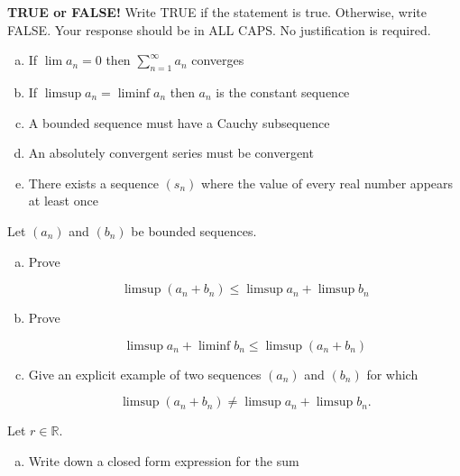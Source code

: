 \documentclass[11pt]{exam}
\theoremstyle{definition}
\begin{document}
\begin{questions}

\addpoints

\question[10]\mbox{}
\textbf{TRUE or FALSE!}  Write  TRUE if the statement is true.  Otherwise, write FALSE.  Your response should be in ALL CAPS.  No justification is required.
\begin{enumerate}[(a)]
\item  
If $\lim a_n = 0$ then $\sum_{n=1}^\infty a_n$ converges
\vspace{1.3in}
\item
If $\limsup a_n=\liminf a_n$ then $a_n$ is the constant sequence
\vspace{1.3in}
\item
A bounded sequence must have a Cauchy subsequence
\vspace{1.3in}
\item
An absolutely convergent series must be convergent
\vspace{1.3in}
\item  
There exists a sequence $(s_n)$ where the value of every real number appears at least once
\vspace{1.3in}
\end{enumerate}

\newpage
\question[10]\mbox{}

Let $(a_n)$ and $(b_n)$ be bounded sequences.
\begin{enumerate}[(a)]
\item Prove

$$\limsup (a_n+b_n)\leq \limsup a_n + \limsup b_n$$
\vspace{2.5in}
\item Prove

$$\limsup a_n + \liminf b_n \leq\limsup (a_n+b_n)$$
\vspace{2.5in}

\item

Give an explicit example of two sequences $(a_n)$ and $(b_n)$ for which 

$$\limsup (a_n+b_n)\neq \limsup a_n + \limsup b_n.$$

\end{enumerate}


\newpage
\question[10]\mbox{}

Let $r\in\mathbb{R}$.
\begin{enumerate}[(a)]
\item Write down a closed form expression for the sum


\end{enumerate}
\end{questions}
\end{document}

